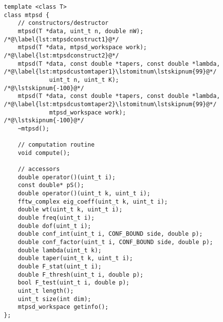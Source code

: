 \begin{lstlisting}[label=lst:mtpsdclass,caption=The \texttt{mtpsd} class]
template <class T>
class mtpsd {
    // constructors/destructor
    mtpsd(T *data, uint_t n, double nW);                       /*@\label{lst:mtpsdconstruct1}@*/
    mtpsd(T *data, mtpsd_workspace work);                      /*@\label{lst:mtpsdconstruct2}@*/
    mtpsd(T *data, const double *tapers, const double *lambda, /*@\label{lst:mtpsdcustomtaper1}\lstomitnum\lstskipnum{99}@*/
             uint_t n, uint_t K);                              /*@\lstskipnum{-100}@*/
    mtpsd(T *data, const double *tapers, const double *lambda, /*@\label{lst:mtpsdcustomtaper2}\lstomitnum\lstskipnum{99}@*/
             mtpsd_workspace work);                            /*@\lstskipnum{-100}@*/
    ~mtpsd();
    
    // computation routine
    void compute();

    // accessors
    double operator()(uint_t i);           
    const double* pS();
    double operator()(uint_t k, uint_t i);
    fftw_complex eig_coeff(uint_t k, uint_t i); 
    double wt(uint_t k, uint_t i);       
    double freq(uint_t i);                
    double dof(uint_t i);                          
    double conf_int(uint_t i, CONF_BOUND side, double p); 
    double conf_factor(uint_t i, CONF_BOUND side, double p);
    double lambda(uint_t k);
    double taper(uint_t k, uint_t i);
    double F_stat(uint_t i);  
    double F_thresh(uint_t i, double p); 
    bool F_test(uint_t i, double p); 
    uint_t length();  
    uint_t size(int dim);
    mtpsd_workspace getinfo();
};
\end{lstlisting}

